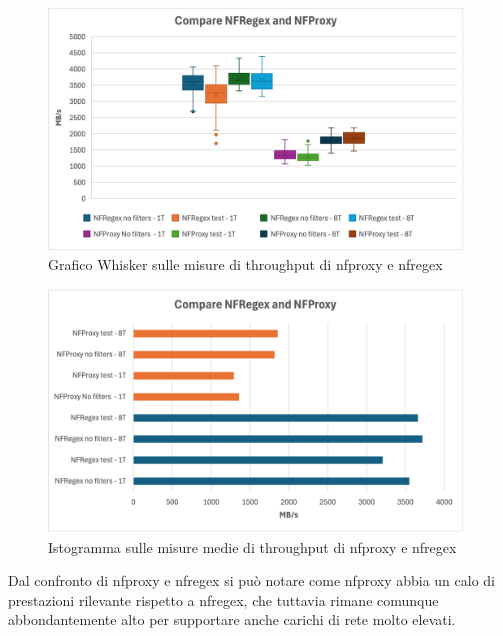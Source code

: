 \begin{figure}[H]
    \centering
    \includegraphics[width=0.98\textwidth]{images/chapter4/whisker_compare.png}
    \caption{Grafico Whisker sulle misure di throughput di nfproxy e nfregex}
    \label{fig:wisker_nfproxy_nfregex}
\end{figure}

\begin{figure}[H]
    \centering
    \includegraphics[width=0.98\textwidth]{images/chapter4/istrogramma_compare.png}
    \caption{Istogramma sulle misure medie di throughput di nfproxy e nfregex}
    \label{fig:istogramma_nfproxy_nfregex}
\end{figure}

Dal confronto di nfproxy e nfregex si può notare come nfproxy abbia un calo di prestazioni rilevante rispetto a nfregex, che tuttavia
rimane comunque abbondantemente alto per supportare anche carichi di rete molto elevati.\\
